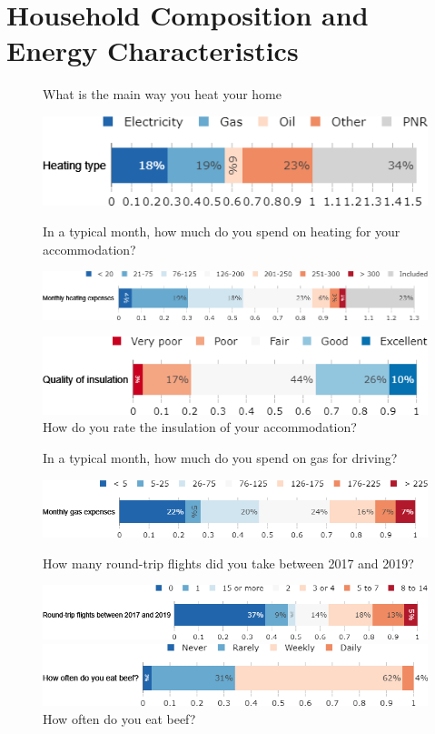 \documentclass[aspectratio=169,9pt,dvipsnames]{beamer}
\begin{document}
\section{Household Composition and Energy Characteristics}
\begin{frame}{}%
\begin{figure}[h!]
\caption{What is the main way you heat your home}

\centering
\includegraphics[width=.5\textwidth]{../figures/DK/heating_DK.png} \\
\vspace{.5cm}
\caption{In a typical month, how much do you spend on heating for your accommodation?}
\includegraphics[width=.7\textwidth]{../figures/DK/heating_expenses_DK.png} \\
\vspace{.5cm}
\centering
\caption{How do you rate the insulation of your accommodation?}
\includegraphics[width=.6\textwidth]{../figures/DK/insulation_DK.png}
\end{figure}
\end{frame}

\begin{frame}{}%
\begin{figure}[h!]
\centering
\caption{In a typical month, how much do you spend on gas for driving?}
\includegraphics[width=.6\textwidth]{../figures/DK/gas_expenses_DK.png} \\
\vspace{.5cm}
\caption{How many round-trip flights did you take between 2017 and 2019?}
\includegraphics[width=.7\textwidth]{../figures/DK/flights_3y_DK.png}
\vspace{.5cm}
\caption{How often do you eat beef?}
\includegraphics[width=.7\textwidth]{../figures/DK/frequency_beef_DK.png}
\end{figure}
\end{frame}
\end{document}
